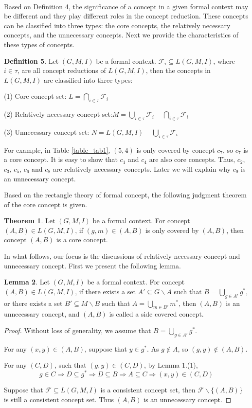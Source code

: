 \documentclass[11pt]{article}
\numberwithin{equation}{subsection}
\begin{document}
\

Based on Definition 4, the significance of a concept in a given  formal context
may be different and they play different roles in
the concept reduction. These concepts can be
classified into three types: the core
concepts, the relatively necessary
concepts, and the  unnecessary
concepts. Next we provide the characteristics
of these types of concepts.


\textbf{Definition 5}. \cite{Cao,Wei} Let $(G, M, I)$ be a formal context.
$\mathcal{F}_i\subseteq L(G, M, I)$, where $ i\in \tau$, are all
concept reductions of $L(G, M, I)$, then the concepts in $L(G, M, I)$ are classified
into three types:

(1) Core concept set:
$L =\bigcap\limits_{i\in \tau}\mathcal{F}_i$

(2) Relatively necessary concept set:$ M = \bigcup\limits_{i\in \tau}\mathcal{F}_i-\bigcap\limits_{i\in \tau}\mathcal{F}_i$

(3) Unnecessary  concept set: $N =L(G, M, I)-\bigcup\limits_{i\in \tau}\mathcal{F}_i$


For example,  in Table \ref{table_tab1}, $(5,4)$ is only covered by concept $c_7$, so  $c_7$
  is a core concept. It is easy to show that $c_1$ and $c_4$
  are also  core concepts. Thus, $c_2$,  $c_3$,  $c_5$,  $c_6$ and $c_8$ are relatively necessary concepts.
  Later we will explain why $c_9$ is an unnecessary concept.

Based on the rectangle theory of formal concept, the following judgment theorem of the core concept is given.

\textbf{ Theorem 1}. \cite{Cao,Wei} Let $(G, M, I)$ be a formal context. For concept $(A,B)\in L(G, M, I)$, if $(g,m)\in(A,B)$ is only covered by $(A,B)$, then concept $(A,B)$ is a core concept.



In what follows, our focus   is the discussions of  relatively necessary concept and unnecessary concept. First we present the following lemma.

\textbf{ Lemma 2}. Let $(G, M, I)$ be a formal context. For concept $(A,B)\in L(G, M, I)$, if there exists a set $A'\subseteq G\backslash A$
such that $B=\bigcup\limits_{g\in A'}g^*$,
or there exists a set $B'\subseteq M\backslash B$
such that $A=\bigcup\limits_{m\in B'}m^*$, then $(A,B)$ is an  unnecessary concept, and $(A,B)$ is called a  side covered concept.


\begin{proof}  Without
loss of generality, we assume that $B=\bigcup\limits_{g\in A'}g^*$.

For any $(x,y)\in (A,B)$, suppose that $y\in g^*$. As $g\notin A$, so $(g,y)\notin (A,B)$.

For any $(C,D)$, such that $(g,y)\in (C,D)$, by  Lemma 1.(1),
\[g\in C \Rightarrow D\subseteq g^* \Rightarrow D\subseteq B \Rightarrow A\subseteq C  \Rightarrow (x,y)\in (C,D)\]

Suppose that
 $\mathcal{F}\subseteq L(G, M, I)$ is   a  consistent concept set,  then $\mathcal{F}\backslash \{(A,B)\}$ is still  a  consistent concept set.
 Thus $(A,B)$ is an  unnecessary concept.
\end{proof}
\end{document}
